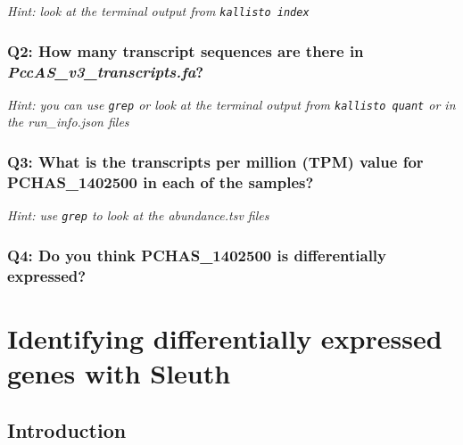\documentclass[11pt]{article}
\begin{document}
\textit{Hint: look at the terminal output from \texttt{kallisto\ index}}

\hypertarget{q2-how-many-transcript-sequences-are-there-in-pccas_v3_transcripts.fa}{%
\subsubsection{\texorpdfstring{Q2: How many transcript sequences are
there in
\textit{PccAS\_v3\_transcripts.fa}?}{Q2: How many transcript sequences are there in PccAS\_v3\_transcripts.fa?}}\label{q2-how-many-transcript-sequences-are-there-in-pccas_v3_transcripts.fa}}

\textit{Hint: you can use \texttt{grep} or look at the terminal output
from \texttt{kallisto\ quant} or in the run\_info.json files}

\hypertarget{q3-what-is-the-transcripts-per-million-tpm-value-for-pchas_1402500-in-each-of-the-samples}{%
\subsubsection{Q3: What is the transcripts per million (TPM) value for
PCHAS\_1402500 in each of the
samples?}\label{q3-what-is-the-transcripts-per-million-tpm-value-for-pchas_1402500-in-each-of-the-samples}}

\textit{Hint: use \texttt{grep} to look at the abundance.tsv files}

\hypertarget{q4-do-you-think-pchas_1402500-is-differentially-expressed}{%
\subsubsection{Q4: Do you think PCHAS\_1402500 is differentially
expressed?}\label{q4-do-you-think-pchas_1402500-is-differentially-expressed}}


\newpage

    \hypertarget{identifying-differentially-expressed-genes-with-sleuth}{%
\section{Identifying differentially expressed genes with
Sleuth}\label{identifying-differentially-expressed-genes-with-sleuth}}

    \hypertarget{introduction}{%
\subsection{Introduction}\label{introduction}}
\end{document}
